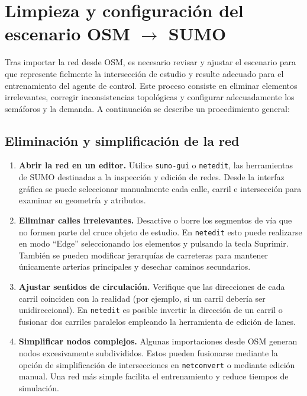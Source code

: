 \section{Limpieza y configuración del escenario OSM $\rightarrow$ SUMO}

Tras importar la red desde OSM, es necesario revisar y ajustar el
escenario para que represente fielmente la intersección de estudio y
resulte adecuado para el entrenamiento del agente de control. Este
proceso consiste en eliminar elementos irrelevantes, corregir
inconsistencias topológicas y configurar adecuadamente los semáforos y
la demanda. A continuación se describe un procedimiento general:

\subsection*{Eliminación y simplificación de la red}

\begin{enumerate}
  \item \textbf{Abrir la red en un editor.} Utilice \verb|sumo-gui| o
    \texttt{netedit}, las herramientas de SUMO destinadas a la
    inspección y edición de redes. Desde la interfaz gráfica se puede
    seleccionar manualmente cada calle, carril e intersección para
    examinar su geometría y atributos.

  \item \textbf{Eliminar calles irrelevantes.} Desactive o borre los
    segmentos de vía que no formen parte del cruce objeto de estudio.
    En \texttt{netedit} esto puede realizarse en modo ``Edge''
    seleccionando los elementos y pulsando la tecla Suprimir. También
    se pueden modificar jerarquías de carreteras para mantener
    únicamente arterias principales y desechar caminos secundarios.

  \item \textbf{Ajustar sentidos de circulación.} Verifique que las
    direcciones de cada carril coinciden con la realidad (por ejemplo,
    si un carril debería ser unidireccional). En \texttt{netedit}
    es posible invertir la dirección de un carril o fusionar dos
    carriles paralelos empleando la herramienta de edición de lanes.

  \item \textbf{Simplificar nodos complejos.} Algunas importaciones
    desde OSM generan nodos excesivamente subdivididos. Estos pueden
    fusionarse mediante la opción de simplificación de intersecciones
    en \texttt{netconvert} o mediante edición manual. Una red más
    simple facilita el entrenamiento y reduce tiempos de simulación.
\end{enumerate}


